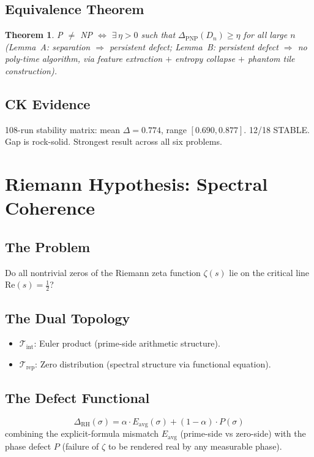\documentclass[12pt, openany]{book}
\newtheorem{theorem}{Theorem}[chapter]
\theoremstyle{remark}
\newcommand{\Tint}{\mathcal{T}_{\mathrm{int}}}
\newcommand{\Trep}{\mathcal{T}_{\mathrm{rep}}}
\begin{document}
\subsection{Equivalence Theorem}
\begin{theorem}
P $\neq$ NP $\Longleftrightarrow$ $\exists\, \eta > 0$ such that
$\Delta_{\mathrm{PNP}}(D_n) \geq \eta$ for all large $n$
(Lemma~A: separation $\Rightarrow$ persistent defect;
Lemma~B: persistent defect $\Rightarrow$ no poly-time algorithm, via
feature extraction $+$ entropy collapse $+$ phantom tile construction).
\end{theorem}

\subsection{CK Evidence}
108-run stability matrix: mean $\Delta = 0.774$, range $[0.690, 0.877]$.
12/18 STABLE. Gap is rock-solid. Strongest result across all six problems.


\section{Riemann Hypothesis: Spectral Coherence}
\label{sec:rh}

\subsection{The Problem}
Do all nontrivial zeros of the Riemann zeta function $\zeta(s)$ lie on the
critical line $\mathrm{Re}(s) = \tfrac{1}{2}$?

\subsection{The Dual Topology}
\begin{itemize}
  \item $\Tint$: Euler product (prime-side arithmetic structure).
  \item $\Trep$: Zero distribution (spectral structure via functional equation).
\end{itemize}

\subsection{The Defect Functional}
\[
  \boxed{\Delta_{\mathrm{RH}}(\sigma) = \alpha \cdot E_{\mathrm{avg}}(\sigma) + (1-\alpha) \cdot P(\sigma)}
\]
combining the explicit-formula mismatch $E_{\mathrm{avg}}$ (prime-side vs zero-side)
with the phase defect $P$ (failure of $\zeta$ to be rendered real by any measurable phase).
\end{document}
